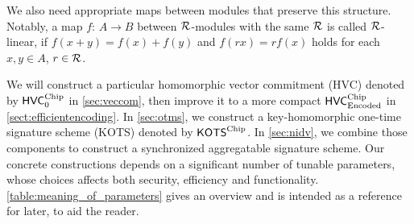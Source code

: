 We also need appropriate maps between modules that preserve this structure. Notably, a map $f\colon\,A\to B$ between $\mathcal{R}$-modules with the same $\mathcal{R}$ is called $\mathcal{R}$-linear, if $f(x+y) = f(x) + f(y)$ and $f(rx) = rf(x)$ holds for each $x,y\in A$, $r\in\mathcal{R}$.





We will construct a particular homomorphic vector commitment (HVC) denoted by $\mathsf{HVC}^{\textup{Chip}}_{0}$ in \autoref{sec:veccom}, then improve it to a more compact $\mathsf{HVC}_{\textup{Encoded}}^{\textup{Chip}}$ in \autoref{sect:efficientencoding}.
In \autoref{sec:otms}, we construct a key-homomorphic one-time signature scheme (KOTS) denoted by $\mathsf{KOTS}^{\textup{Chip}}$. In \autoref{sec:nidv}, we combine those components to construct a synchronized aggregatable signature scheme.
Our concrete constructions depends on a significant number of tunable parameters, whose choices affects both security, efficiency and functionality. \autoref{table:meaning_of_parameters} gives an overview and is intended as a reference for later, to aid the reader.

